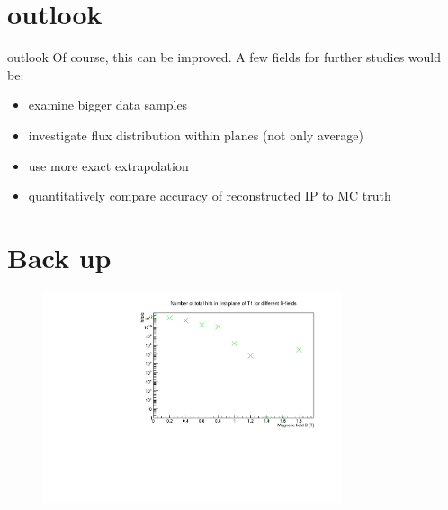 \section{outlook}

\begin{frame}[t]{outlook}
  \vspace*{\fill}
    Of course, this can be improved. A few fields for further studies would be:
    \begin{itemize}
      \item examine bigger data samples
      \item investigate flux distribution within planes (not only average)
      \item use more exact extrapolation
      \item quantitatively compare accuracy of reconstructed IP to MC truth
    \end{itemize}
  \vspace*{\fill}
\end{frame}

\section{Back up}
\appendix

\begin{frame}
  \begin{figure}
    \centering
    \includegraphics[width=0.78\textwidth]{fig/hits_bfield.pdf}
  \end{figure}
\end{frame}

